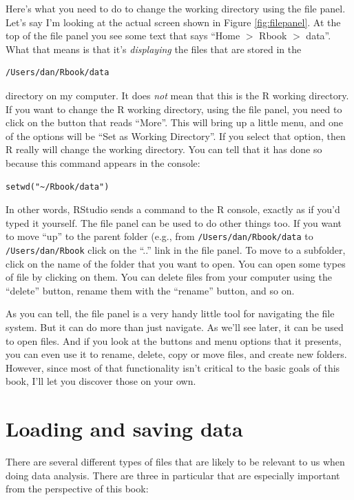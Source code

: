 \documentclass[
]{book}
\begin{document}
Here's what you need to do to change the working directory using the file panel. Let's say I'm looking at the actual screen shown in Figure \ref{fig:filepanel}. At the top of the file panel you see some text that says ``Home \(>\) Rbook \(>\) data''. What that means is that it's \emph{displaying} the files that are stored in the

\begin{verbatim}
/Users/dan/Rbook/data
\end{verbatim}

directory on my computer. It does \emph{not} mean that this is the R working directory. If you want to change the R working directory, using the file panel, you need to click on the button that reads ``More''. This will bring up a little menu, and one of the options will be ``Set as Working Directory''. If you select that option, then R really will change the working directory. You can tell that it has done so because this command appears in the console:

\begin{verbatim}
setwd("~/Rbook/data")
\end{verbatim}

In other words, RStudio sends a command to the R console, exactly as if you'd typed it yourself. The file panel can be used to do other things too. If you want to move ``up'' to the parent folder (e.g., from \texttt{/Users/dan/Rbook/data} to \texttt{/Users/dan/Rbook} click on the ``..'' link in the file panel. To move to a subfolder, click on the name of the folder that you want to open. You can open some types of file by clicking on them. You can delete files from your computer using the ``delete'' button, rename them with the ``rename'' button, and so on.

As you can tell, the file panel is a very handy little tool for navigating the file system. But it can do more than just navigate. As we'll see later, it can be used to open files. And if you look at the buttons and menu options that it presents, you can even use it to rename, delete, copy or move files, and create new folders. However, since most of that functionality isn't critical to the basic goals of this book, I'll let you discover those on your own.

\hypertarget{load}{%
\section{Loading and saving data}\label{load}}

There are several different types of files that are likely to be relevant to us when doing data analysis. There are three in particular that are especially important from the perspective of this book:
\end{document}
